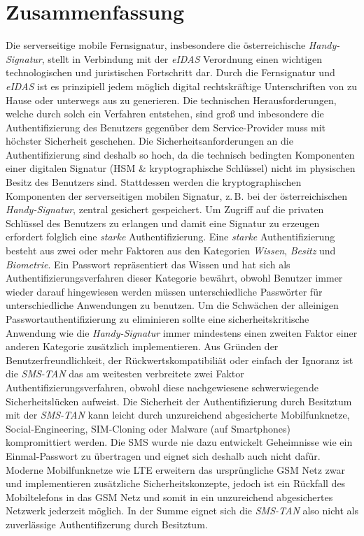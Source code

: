 \documentclass[11pt,a4paper,ngerman]{scrreprt}
\begin{document}
\chapter{Zusammenfassung}
Die serverseitige mobile Fernsignatur, insbesondere die österreichische \textit{Handy-Signatur}, stellt in Verbindung mit der \textit{eIDAS} Verordnung einen wichtigen technologischen und juristischen Fortschritt dar. Durch die Fernsignatur und \textit{eIDAS} ist es prinzipiell jedem möglich digital rechtskräftige Unterschriften von zu Hause oder unterwegs aus zu generieren. Die technischen Herausforderungen, welche durch solch ein Verfahren entstehen, sind groß und inbesondere die Authentifizierung des Benutzers gegenüber dem Service-Provider muss mit höchster Sicherheit geschehen. Die Sicherheitsanforderungen an die Authentifizierung sind deshalb so hoch, da die technisch bedingten Komponenten einer digitalen Signatur (HSM \& kryptographische Schlüssel) nicht im physischen Besitz des Benutzers sind. Stattdessen werden die kryptographischen Komponenten der serverseitigen mobilen Signatur, z.\,B. bei der österreichischen \textit{Handy-Signatur}, zentral gesichert gespeichert. Um Zugriff auf die privaten Schlüssel des Benutzers zu erlangen und damit eine Signatur zu erzeugen erfordert folglich eine \textit{starke} Authentifizierung. Eine \textit{starke} Authentifizierung besteht aus zwei oder mehr Faktoren aus den Kategorien \emph{Wissen}, \emph{Besitz} und \emph{Biometrie}. Ein Passwort repräsentiert das Wissen und hat sich als Authentifizierungsverfahren dieser Kategorie bewährt, obwohl Benutzer immer wieder darauf hingewiesen werden müssen unterschiedliche Passwörter für unterschiedliche Anwendungen zu benutzen. Um die Schwächen der alleinigen Passwortauthentifizierung zu eliminieren sollte eine sicherheitskritische Anwendung wie die \textit{Handy-Signatur} immer mindestens einen zweiten Faktor einer anderen Kategorie zusätzlich implementieren. Aus Gründen der Benutzerfreundlichkeit, der Rückwertskompatibiliät oder einfach der Ignoranz ist die \textit{SMS-TAN} das am weitesten verbreitete zwei Faktor Authentifizierungsverfahren, obwohl diese nachgewiesene schwerwiegende Sicherheitslücken aufweist. Die Sicherheit der Authentifizierung durch Besitztum mit der \textit{SMS-TAN} kann leicht durch unzureichend abgesicherte Mobilfunknetze, Social-Engineering, SIM-Cloning oder Malware (auf Smartphones) kompromittiert werden. Die SMS wurde nie dazu entwickelt Geheimnisse wie ein Einmal-Passwort zu übertragen und eignet sich deshalb auch nicht dafür. Moderne Mobilfunknetze wie LTE erweitern das ursprüngliche GSM Netz zwar und implementieren zusätzliche Sicherheitskonzepte, jedoch ist ein Rückfall des Mobiltelefons in das GSM Netz und somit in ein unzureichend abgesichertes Netzwerk jederzeit möglich. In der Summe eignet sich die \textit{SMS-TAN} also nicht als zuverlässige Authentifizerung durch Besitztum.
\end{document}
